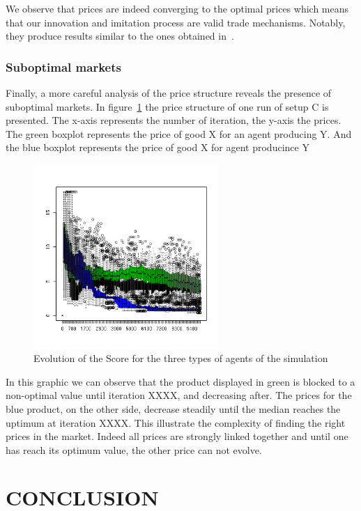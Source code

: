 \documentclass{wscpaperproc}
\begin{document}
We observe that prices are indeed converging to the optimal prices which means that our innovation and imitation process are valid trade mechanisms. Notably, they produce results similar to the ones obtained in~\cite{gintis_emergence_2006}.

\subsubsection{Suboptimal markets}

Finally, a more careful analysis of the price structure reveals the presence of suboptimal markets. In figure~\ref{fig:suboptimal} the price structure of one run of setup C is presented. The x-axis represents the number of iteration, the y-axis the prices. The green boxplot represents the price of good X for an agent producing Y. And the blue boxplot represents the price of good X for agent producince Y 

\begin{figure}[htp]
	\begin{center}
		\includegraphics[width=7cm]{img/suboptimal.png}
	\end{center}
	\caption{Evolution of the Score for the three types of agents of the simulation}
	\label{fig:suboptimal}
\end{figure}

In this graphic we can observe that the product displayed in green is blocked to a non-optimal value until iteration XXXX, and decreasing after. The prices for the blue product, on the other side, decrease steadily until the median reaches the uptimum at iteration XXXX. This illustrate the complexity of finding the right prices in the market. Indeed all prices are strongly linked together and until one has reach its optimum value, the other price can not evolve. 

\section{CONCLUSION}
\end{document}
